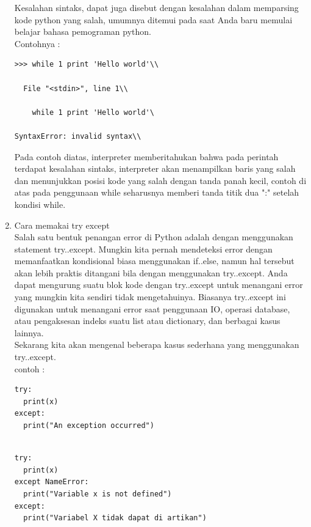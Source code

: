 \begin{enumerate}
Kesalahan sintaks, dapat juga disebut dengan kesalahan dalam memparsing kode
python yang salah, umumnya ditemui pada saat Anda baru memulai belajar bahasa
pemograman python.\\ Contohnya :\\
\begin{verbatim}
>>> while 1 print 'Hello world'\\

  File "<stdin>", line 1\\

    while 1 print 'Hello world'\             

SyntaxError: invalid syntax\\
\end{verbatim}


Pada contoh diatas, interpreter memberitahukan bahwa pada perintah terdapat
kesalahan sintaks, interpreter akan menampilkan baris yang salah dan
menunjukkan posisi kode yang salah dengan tanda panah kecil, contoh di atas pada
penggunaan while seharusnya memberi tanda titik dua ":" setelah kondisi while.

\item Cara memakai try except\\
Salah satu bentuk penangan error di Python adalah dengan menggunakan statement try..except. Mungkin kita pernah mendeteksi error dengan memanfaatkan kondisional biasa menggunakan if..else, namun hal tersebut akan lebih praktis ditangani bila dengan menggunakan try..except. Anda dapat mengurung suatu blok kode dengan try..except untuk menangani error yang mungkin kita sendiri tidak mengetahuinya. Biasanya try..except ini digunakan untuk menangani error saat penggunaan IO, operasi database, atau pengaksesan indeks suatu list atau dictionary, dan berbagai kasus lainnya.\\

Sekarang kita akan mengenal beberapa kasus sederhana yang menggunakan try..except.\\
contoh :
\begin{verbatim}
try:
  print(x)
except:
  print("An exception occurred")
  
\end{verbatim}

\begin{verbatim}
try:
  print(x)
except NameError:
  print("Variable x is not defined")
except:
  print("Variabel X tidak dapat di artikan")
\end{verbatim}

\end{enumerate}
